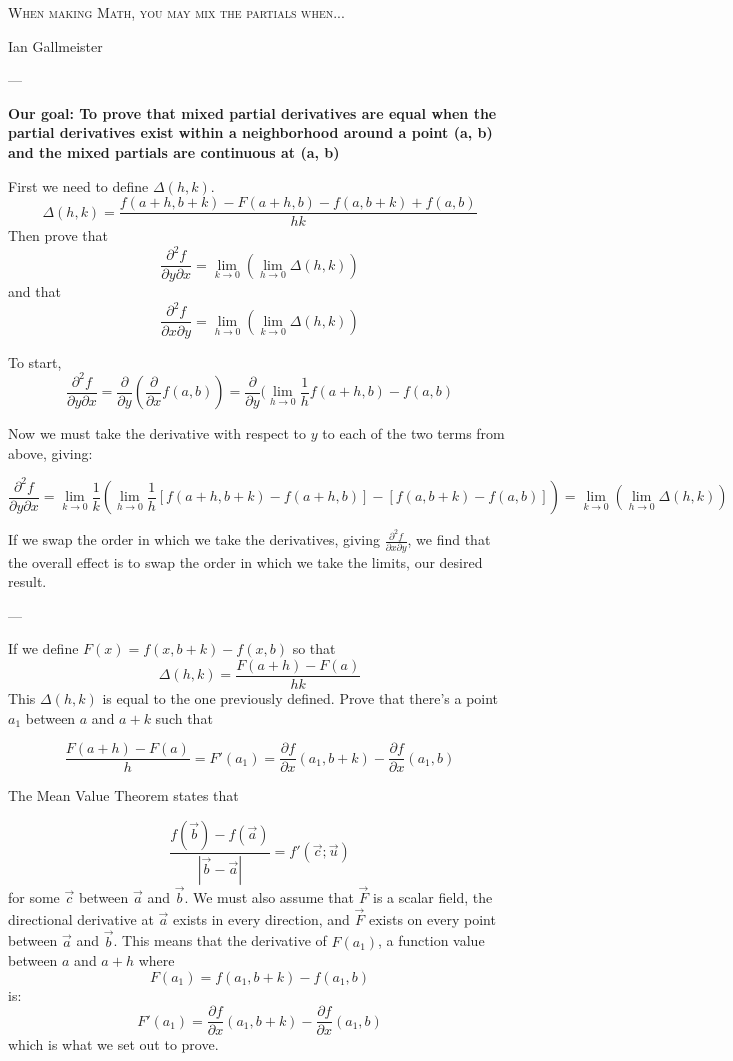 \documentclass{article}
\begin{document}
\textsc{When making Math, you may mix the partials when...}

\smallskip

Ian Gallmeister

\bigskip
\bigskip

---

\textbf{Our goal: To prove that mixed partial derivatives are equal when the partial derivatives exist within a neighborhood around a point (a, b) and the mixed partials are continuous at (a, b)}


\bigskip

First we need to define $\Delta(h, k)$.  $$\Delta(h, k) = \frac{f(a + h, b + k) - F(a + h, b) - f(a, b+k) + f(a, b)}{hk}$$  Then prove that $$\frac{\partial^2 f}{\partial{y}\partial{x}} = \lim_{k \to 0}(\lim_{h \to 0} \Delta(h, k))$$  and that $$\frac{\partial^2 f}{\partial{x}\partial{y}} = \lim_{h \to 0}(\lim_{k \to 0} \Delta(h, k))$$

To start, $$\frac{\partial^2{f}}{\partial{y}\partial{x}} = \frac{\partial}{\partial{y}}(\frac{\partial}{\partial{x}}f(a, b)) =  \frac{\partial}{\partial{y}}(\lim_{h \to 0} \frac{1}{h} f(a + h, b) - f(a, b)$$

Now we must take the derivative with respect to $y$ to each of the two terms from above, giving:

$$\frac{\partial^2{f}}{\partial{y}\partial{x}} = \lim_{k \to 0}\frac{1}{k}(\lim_{h \to 0}\frac{1}{h} [f(a + h, b+ k) - f(a + h, b)] - [f(a, b + k) - f(a, b)]) = \lim_{k \to 0}(\lim_{h \to 0} \Delta(h, k)) $$  

If we swap the order in which we take the derivatives, giving $\frac{\partial^2{f}}{\partial{x}\partial{y}}$, we find that the overall effect is to swap the order in which we take the limits, our desired result.

\bigskip

---

\bigskip

If we define $F(x) = f(x, b + k) - f(x, b)$ so that $$\Delta(h, k) = \frac{F(a + h) - F(a)}{hk}$$  This $\Delta(h, k)$ is equal to the one previously defined.  Prove that there's a point $a_1$ between $a$ and $a+k$ such that 

$$\frac{F(a + h) - F(a)}{h} = F'(a_1) = \frac{\partial{f}}{\partial{x}}(a_1, b + k) - \frac{\partial{f}}{\partial{x}}(a_1, b)$$

The Mean Value Theorem states that 

$$\frac{f(\vec{b}) - f(\vec{a})}{|\vec{b} - \vec{a}|} = f'(\vec{c} ; \vec{u})$$ for some $\vec{c}$ between $\vec{a}$ and $\vec{b}$.  We must also assume that $\vec{F}$ is a scalar field, the directional derivative at $\vec{a}$ exists in every direction, and $\vec{F}$ exists on every point between $\vec{a}$ and $\vec{b}$.  This means that the derivative of $F(a_1)$, a function value between $a$ and $a + h$ where  $$F(a_1) = f(a_1, b + k) - f(a_1, b)$$ is: $$F'(a_1) = \frac{\partial{f}}{\partial{x}}(a_1, b+k) - \frac{\partial{f}}{\partial{x}}(a_1, b)$$
which is what we set out to prove.
\end{document}
